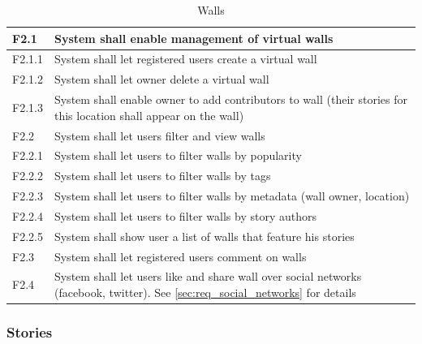 \documentclass[11pt]{book}
\begin{document}
\begin{table}[H]
\centering
\begin{tabular}{ l  p{11cm} }
	F2.1 	& System shall enable management of virtual walls 																	\\ \hline
	F2.1.1 	& System shall let registered users create a virtual wall 															\\ \hline
	F2.1.2 	& System shall let owner delete a virtual wall 																		\\ \hline
	F2.1.3 	& System shall enable owner to add contributors to wall (their stories for this location shall appear on the wall) 	\\ \hline
	F2.2 	& System shall let users filter and view walls 																		\\ \hline
	F2.2.1 	& System shall let users to filter walls by popularity 																\\ \hline
	F2.2.2 	& System shall let users to filter walls by tags 																	\\ \hline
	F2.2.3 	& System shall let users to filter walls by metadata (wall owner, location) 										\\ \hline
	F2.2.4 	& System shall let users to filter walls by story authors 															\\ \hline
	F2.2.5 	& System shall show user a list of walls that feature his stories 													\\ \hline
	F2.3 	& System shall let registered users comment on walls 																\\ \hline
	F2.4 	& System shall let users like and share wall over social networks (facebook, twitter).
				See \ref{sec:req_social_networks} for details 																	\\ 
\end{tabular}
\label{tab:req_walls}
\caption{Walls}
\end{table}

\subsubsection{Stories}
\end{document}
